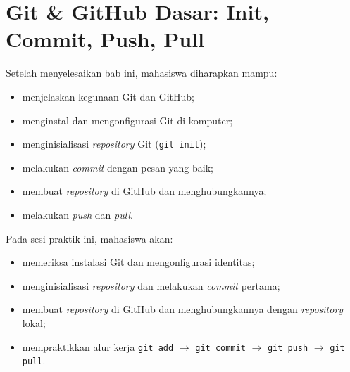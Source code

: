 
\chapter{Git \& GitHub Dasar: Init, Commit, Push, Pull}
\label{chap:git-dasar}

\begin{capaian}
Setelah menyelesaikan bab ini, mahasiswa diharapkan mampu:
\begin{itemize}
  \item menjelaskan kegunaan Git dan GitHub;
  \item menginstal dan mengonfigurasi Git di komputer;
  \item menginisialisasi \emph{repository} Git (\texttt{git init});
  \item melakukan \emph{commit} dengan pesan yang baik;
  \item membuat \emph{repository} di GitHub dan menghubungkannya;
  \item melakukan \emph{push} dan \emph{pull}.
\end{itemize}
\end{capaian}

\begin{tujuanpraktik}
Pada sesi praktik ini, mahasiswa akan:
\begin{itemize}
  \item memeriksa instalasi Git dan mengonfigurasi identitas;
  \item menginisialisasi \emph{repository} dan melakukan \emph{commit} pertama;
  \item membuat \emph{repository} di GitHub dan menghubungkannya dengan \emph{repository} lokal;
  \item mempraktikkan alur kerja \texttt{git add} $\rightarrow$ \texttt{git commit} $\rightarrow$ \texttt{git push} $\rightarrow$ \texttt{git pull}.
\end{itemize}
\end{tujuanpraktik}

